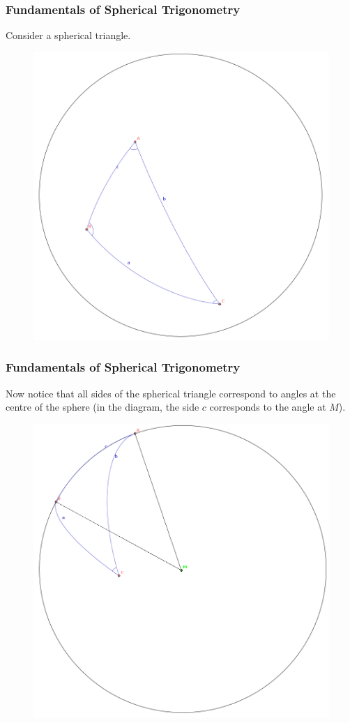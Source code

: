 \documentclass[xcolor=dvipsnames]{beamer}
\begin{document}
\begin{frame}
  \frametitle{Fundamentals of Spherical Trigonometry}
  Consider a spherical triangle.
  \begin{figure}[h]
    \includegraphics[scale=.25]{./SphericalTriangle.png}
  \end{figure}
\end{frame}

\begin{frame}
  \frametitle{Fundamentals of Spherical Trigonometry}
  Now notice that all sides of the spherical triangle correspond to
  angles at the centre of the sphere (in the diagram, the side $c$
  corresponds to the angle at $M$).
  \begin{figure}[h]
    \includegraphics[scale=.2]{./sidesRangles.png}
  \end{figure}
\end{frame}
\end{document}
